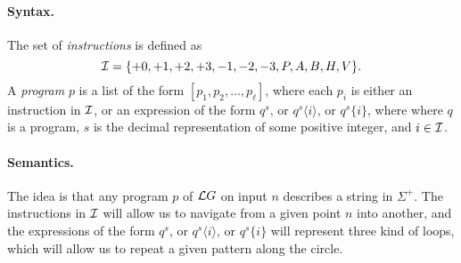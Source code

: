 \paragraph{Syntax.}
The set of {\em instructions} is defined as
$$
\mathcal{I}=\{+0,+1,+2,+3,-1,-2,-3,P,A,B,H,V\}.
$$
A {\em program} $p$ is a list of the form $[p_1,p_2,\dots,p_\ell]$, where each $p_i$ is either an instruction in $\mathcal{I}$, or an expression of the form $q^s$, or $q^s\langle i\rangle$, or $q^s\{i\}$, where where $q$ is a program, $s$ is the decimal representation of some positive integer, and  $i\in\mathcal{I}$.
%
%
%


\paragraph{Semantics.}
The idea is that any program $p$ of $\mathcal{L}G$ on input $n$ describes a string in $\Sigma^+$. The instructions in $\mathcal{I}$ will allow us to navigate from a given point $n$ into another, and the expressions of the form $q^s$, or $q^s\langle i\rangle$, or $q^s\{i\}$ will represent three kind of loops, which will allow us to repeat a given pattern along the circle.

